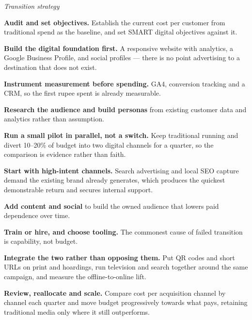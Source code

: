 \begin{qlist}
\textit{Transition strategy}
\begin{apts}
\item \textbf{Audit and set objectives.} Establish the current cost per customer
      from traditional spend as the baseline, and set SMART digital objectives
      against it.
\item \textbf{Build the digital foundation first.} A responsive website with
      analytics, a Google Business Profile, and social profiles --- there is no
      point advertising to a destination that does not exist.
\item \textbf{Instrument measurement before spending.} GA4, conversion tracking
      and a CRM, so the first rupee spent is already measurable.
\item \textbf{Research the audience and build personas} from existing customer
      data and analytics rather than assumption.
\item \textbf{Run a small pilot in parallel, not a switch.} Keep traditional
      running and divert 10--20\% of budget into two digital channels for a
      quarter, so the comparison is evidence rather than faith.
\item \textbf{Start with high-intent channels.} Search advertising and local SEO
      capture demand the existing brand already generates, which produces the
      quickest demonstrable return and secures internal support.
\item \textbf{Add content and social} to build the owned audience that lowers
      paid dependence over time.
\item \textbf{Train or hire, and choose tooling.} The commonest cause of failed
      transition is capability, not budget.
\item \textbf{Integrate the two rather than opposing them.} Put QR codes and
      short URLs on print and hoardings, run television and search together
      around the same campaign, and measure the offline-to-online lift.
\item \textbf{Review, reallocate and scale.} Compare cost per acquisition
      channel by channel each quarter and move budget progressively towards
      what pays, retaining traditional media only where it still outperforms.
\end{apts}


\end{qlist}
